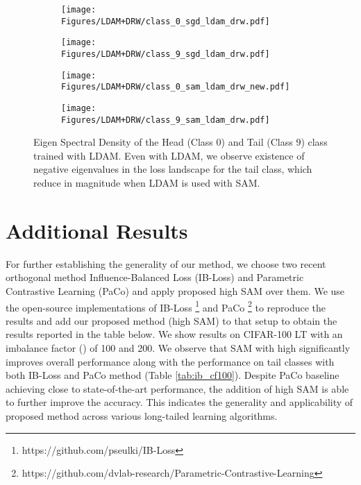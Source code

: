 \documentclass{article}
\begin{document}
\begin{figure}[t]
\begin{subfigure}{.49\textwidth}
  \centering
  \texttt{[image: Figures/LDAM+DRW/class\_0\_sgd\_ldam\_drw.pdf]}  

  \label{fig:sub-first1}
\end{subfigure}
\begin{subfigure}{.49\textwidth}
  \centering
  \texttt{[image: Figures/LDAM+DRW/class\_9\_sgd\_ldam\_drw.pdf]}  

  \label{fig:sub-second10}
\end{subfigure}

\begin{subfigure}{.49\textwidth}
  \centering
  \texttt{[image: Figures/LDAM+DRW/class\_0\_sam\_ldam\_drw\_new.pdf]}  

  \label{fig:sub-third3}
\end{subfigure}
\begin{subfigure}{.49\textwidth}
  \centering
  \texttt{[image: Figures/LDAM+DRW/class\_9\_sam\_ldam\_drw.pdf]}  

  \label{fig:sub-fourth5}
\end{subfigure}

\caption{Eigen Spectral Density of the Head (Class 0) and Tail (Class 9) class trained with LDAM. Even with LDAM, we observe existence of negative eigenvalues in the loss landscape for the tail class, which reduce in magnitude when LDAM is used with SAM.}
\label{fig:app_ldam}

\end{figure}




\section{Additional Results}
\label{app:additional_results}

For further establishing the generality of our method, we choose two recent orthogonal method Influence-Balanced Loss \cite{Park_2021_ICCV} (IB-Loss) and Parametric Contrastive Learning (PaCo) \cite{cui2021parametric} and apply proposed high  SAM over them. We use the open-source implementations of IB-Loss \footnote{https://github.com/pseulki/IB-Loss} and PaCo \footnote{https://github.com/dvlab-research/Parametric-Contrastive-Learning} to reproduce the results and add our proposed method (high  SAM) to that setup to obtain the results reported in the table below. We show results on CIFAR-100 LT with an imbalance factor () of 100 and 200. We observe that SAM with high  significantly improves overall performance along with the performance on tail classes with both IB-Loss and PaCo method (Table \ref{tab:ib_cf100}). Despite PaCo baseline achieving close to state-of-the-art performance, the addition of high  SAM is able to further improve the accuracy. This indicates the generality and applicability of proposed method across various long-tailed learning algorithms.
\end{document}

